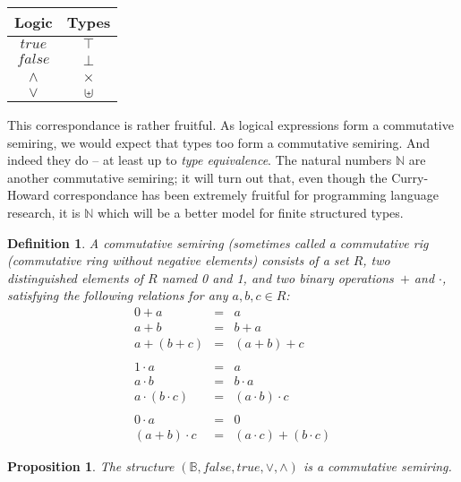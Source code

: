 \documentclass{article}
\newtheorem{defn}{Definition}[section]
\newtheorem{prop}{Proposition}[section]
\newcommand{\Nat}{\ensuremath{\mathbb{N}}}
\newcommand{\true}{\mathit{true}}
\newcommand{\false}{\mathit{false}}
\begin{document}
\begin{center}
\begin{tabular}{c|c}
Logic & Types \\ \hline
$\true$ & $\top$ \\
$\false$ & $\bot$ \\
$\land$ & $\times$ \\
$\lor$ & $\uplus$ \\
\end{tabular}
\end{center}

This correspondance is rather fruitful. As logical expressions form
a commutative semiring, we would expect that types too form a commutative
semiring. And indeed they do -- at least up to \emph{type equivalence}.  The
natural numbers $\Nat$ are another commutative semiring; it will turn out that,
even though the Curry-Howard correspondance has been extremely fruitful for
programming language research, it is $\Nat$ which will be a better model for
finite structured types.

\begin{defn}
  A \emph{commutative semiring} (sometimes called a \emph{commutative
    rig} (commutative ri\emph{n}g without negative elements) consists of a
  set $R$, two distinguished elements of $R$ named 0 and 1, and two
  binary operations~$+$ and $\cdot$, satisfying the following
  relations for any $a,b,c \in R$:
\begin{equation}
\begin{array}{rcl}
0 + a &=& a \\
a + b &=& b + a \\
a + (b + c) &=& (a + b) + c \\
\\
1 \cdot a &=& a \\
a \cdot b &=& b \cdot a \\
a \cdot (b \cdot c) &=& (a \cdot b) \cdot c \\
\\
0 \cdot a &=& 0 \\
(a + b) \cdot c &=& (a \cdot c) + (b \cdot c)
\end{array}
\label{eq:csemiring}
\end{equation}
\end{defn}

\begin{prop}
The structure $\left(\mathbb{B}, \false, \true, \lor, \land\right)$
is a commutative semiring.
\end{prop}
\end{document}

